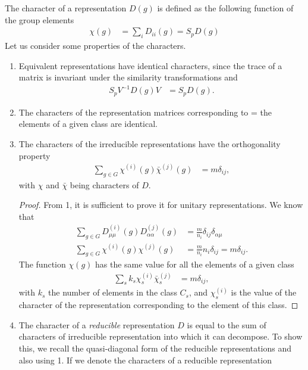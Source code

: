 The character of a representation $D(g)$ is defined as the following function
of the group elements
\begin{align}
    \chi(g)&=\sum_i D_{ii}(g)=S_p D(g)
\end{align}
Let us consider some properties of the characters.
\begin{enumerate}
    \item Equivalent representations have identical characters, since the
        trace of a matrix is invariant under the similarity transformations and
        \begin{align}
            S_p V^{-1}D(g)V&=S_p D(g).
        \end{align}
    \item The characters of the representation matrices corresponding to =
        the elements of a given class are identical.
    \item The characters of the irreducible representations have the orthogonality 
        property
        \begin{align}
            \sum_{g\in G}\chi^{(i)}(g)\bar{\chi}^{(j)}(g)&=m\delta_{ij},
        \end{align}
        with $\chi$ and $\bar{\chi}$ being characters of $D$.
\begin{proof}
    From 1, it is sufficient to prove it for unitary representations. We know
    that
    \begin{align}
        \sum_{g\in G}D^{(i)}_{\mu\mu}(g)D^{(j)}_{\alpha\alpha}(g)&=\frac m{n_i}
        \delta_{ij}\delta_{\alpha\mu}\\
        \sum_{g\in G}\chi^{(i)}(g)\chi^{(j)}(g)&=\frac m{n_i}n_i\delta_{ij}=m\delta_{ij}.
    \end{align}
    The function $\chi(g)$ has the same value for all the elements of a given
    class
    \begin{align}
        \sum_s k_s\chi_s^{(i)}\bar{\chi}_s^{(j)}&=m\delta_{ij},
    \end{align}
    with $k_s$ the number of elements in the class $C_s$, and $\chi_s^{(i)}$ is
    the value of the character of the representation corresponding to the element
    of this class.
\end{proof}
\item The character of a \emph{reducible} representation $D$ is equal to the sum
    of characters of irreducible representation into which it can decompose. To
    show this, we recall the quasi-diagonal form of the reducible representations
    and also using 1. If we denote the characters of a reducible representation

\end{enumerate}
